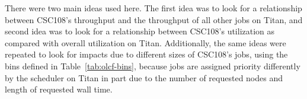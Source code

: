 There were two main ideas used here. The first idea was to look for a
relationship between CSC108's throughput and the throughput of all other jobs
on Titan, and second idea was to look for a relationship between CSC108's
utilization as compared with overall utilization on Titan. Additionally, the
same ideas were repeated to look for impacts due to different sizes of CSC108's
jobs, using the bins defined in Table~\ref{tab:olcf-bins}, because jobs are
assigned priority differently by the scheduler on Titan in part due to the
number of requested nodes and length of requested wall time.

\begin{figure}
  \vspace{1em}

\end{figure}
